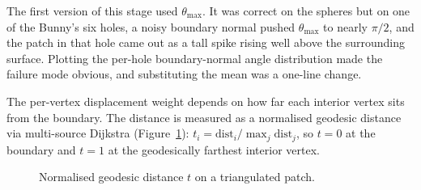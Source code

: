 The first version of this stage used $\theta_{\max}$. It was correct on the spheres but on one of the Bunny's six holes, a noisy boundary normal pushed $\theta_{\max}$ to nearly $\pi/2$, and the patch in that hole came out as a tall spike rising well above the surrounding surface. Plotting the per-hole boundary-normal angle distribution made the failure mode obvious, and substituting the mean was a one-line change.

The per-vertex displacement weight depends on how far each interior vertex sits from the boundary. The distance is measured as a normalised geodesic distance via multi-source Dijkstra (Figure~\ref{fig:dijkstra-distance}): $t_i = \text{dist}_i / \max_j \text{dist}_j$, so $t = 0$ at the boundary and $t = 1$ at the geodesically farthest interior vertex.

\begin{figure}[H]
    \centering
    \caption{Normalised geodesic distance $t$ on a triangulated patch.}
    \label{fig:dijkstra-distance}
\end{figure}

